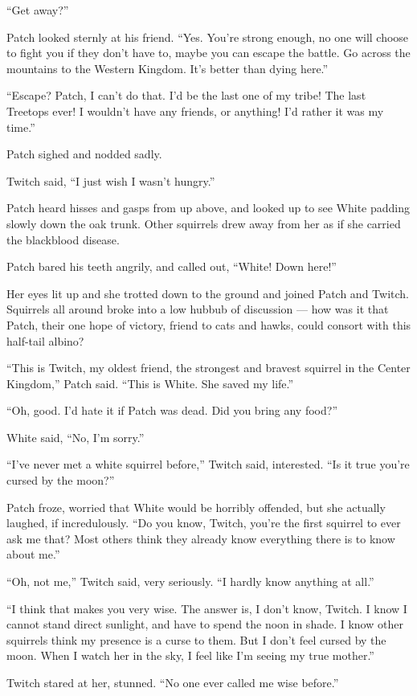\documentclass[ebook,oneside,openany,12pt]{memoir}
\begin{document}
“Get away?”

Patch looked sternly at his friend. “Yes. You’re strong enough, no one
will choose to fight you if they don’t have to, maybe you can escape
the battle. Go across the mountains to the Western Kingdom. It’s
better than dying here.”

“Escape? Patch, I can’t do that. I’d be the last one of my tribe! The
last Treetops ever! I wouldn’t have any friends, or anything! I’d
rather it was my time.”

Patch sighed and nodded sadly.

Twitch said, “I just wish I wasn’t hungry.”

Patch heard hisses and gasps from up above, and looked up to see White
padding slowly down the oak trunk. Other squirrels drew away from her
as if she carried the blackblood disease.

Patch bared his teeth angrily, and called out, “White! Down here!”

Her eyes lit up and she trotted down to the ground and joined Patch
and Twitch. Squirrels all around broke into a low hubbub of discussion
— how was it that Patch, their one hope of victory, friend to cats and
hawks, could consort with this half-tail albino?

“This is Twitch, my oldest friend, the strongest and bravest squirrel
in the Center Kingdom,” Patch said. “This is White. She saved my
life.”

“Oh, good. I’d hate it if Patch was dead. Did you bring any food?”

White said, “No, I’m sorry.”

“I’ve never met a white squirrel before,” Twitch said, interested. “Is
it true you’re cursed by the moon?”

Patch froze, worried that White would be horribly offended, but she
actually laughed, if incredulously. “Do you know, Twitch, you’re the
first squirrel to ever ask me that? Most others think they already
know everything there is to know about me.”

“Oh, not me,” Twitch said, very seriously. “I hardly know anything at
all.”

“I think that makes you very wise. The answer is, I don’t know,
Twitch. I know I cannot stand direct sunlight, and have to spend the
noon in shade. I know other squirrels think my presence is a curse to
them. But I don’t feel cursed by the moon. When I watch her in the
sky, I feel like I’m seeing my true mother.”

Twitch stared at her, stunned. “No one ever called me wise before.”
\end{document}
